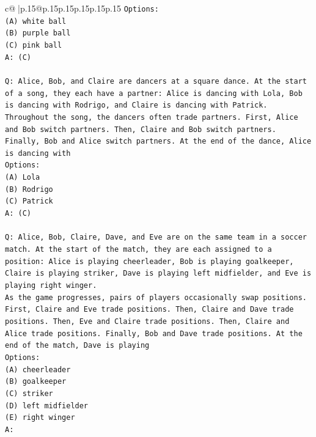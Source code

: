 \documentclass{article}
\begin{document}
{\begin{supertabular}{c@{$\;$}|p{.15\linewidth}@{}p{.15\linewidth}p{.15\linewidth}p{.15\linewidth}p{.15\linewidth}p{.15\linewidth}}
{{{\texttt{Options:} \\
\texttt{(A) white ball} \\
\texttt{(B) purple ball} \\
\texttt{(C) pink ball} \\
\texttt{A: (C)} \\
\\ 
\texttt{Q: Alice, Bob, and Claire are dancers at a square dance. At the start of a song, they each have a partner: Alice is dancing with Lola, Bob is dancing with Rodrigo, and Claire is dancing with Patrick.} \\
\texttt{Throughout the song, the dancers often trade partners. First, Alice and Bob switch partners. Then, Claire and Bob switch partners. Finally, Bob and Alice switch partners. At the end of the dance, Alice is dancing with} \\
\texttt{Options:} \\
\texttt{(A) Lola} \\
\texttt{(B) Rodrigo} \\
\texttt{(C) Patrick} \\
\texttt{A: (C)} \\
\\ 
\texttt{Q: Alice, Bob, Claire, Dave, and Eve are on the same team in a soccer match. At the start of the match, they are each assigned to a position: Alice is playing cheerleader, Bob is playing goalkeeper, Claire is playing striker, Dave is playing left midfielder, and Eve is playing right winger.} \\
\texttt{As the game progresses, pairs of players occasionally swap positions. First, Claire and Eve trade positions. Then, Claire and Dave trade positions. Then, Eve and Claire trade positions. Then, Claire and Alice trade positions. Finally, Bob and Dave trade positions. At the end of the match, Dave is playing} \\
\texttt{Options:} \\
\texttt{(A) cheerleader} \\
\texttt{(B) goalkeeper} \\
\texttt{(C) striker} \\
\texttt{(D) left midfielder} \\
\texttt{(E) right winger} \\
\texttt{A:} \\
            }
        }
    }
     \\ \\


\end{supertabular}}
\end{document}
